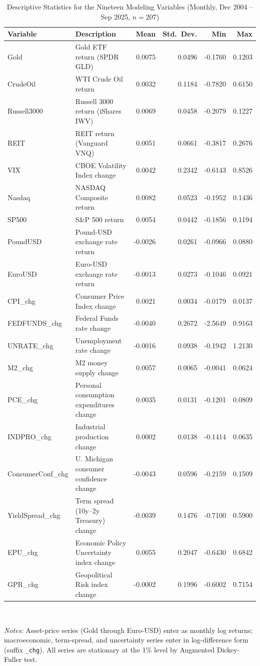 \begin{table}[h!]
\centering
\small
\caption{Descriptive Statistics for the Nineteen Modeling Variables (Monthly, Dec 2004 -- Sep 2025, $n=207$)}
\label{tab:descriptive}
\begin{tabular}{llrrrr}
\toprule
\textbf{Variable} & \textbf{Description} & \textbf{Mean} & \textbf{Std.\ Dev.} & \textbf{Min} & \textbf{Max} \\
\midrule
Gold & Gold ETF return (SPDR GLD) & 0.0075 & 0.0496 & -0.1760 & 0.1203 \\
CrudeOil & WTI Crude Oil return & 0.0032 & 0.1184 & -0.7820 & 0.6150 \\
Russell3000 & Russell 3000 return (iShares IWV) & 0.0069 & 0.0458 & -0.2079 & 0.1227 \\
REIT & REIT return (Vanguard VNQ) & 0.0051 & 0.0661 & -0.3817 & 0.2676 \\
VIX & CBOE Volatility Index change & 0.0042 & 0.2342 & -0.6143 & 0.8526 \\
Nasdaq & NASDAQ Composite return & 0.0082 & 0.0523 & -0.1952 & 0.1436 \\
SP500 & S\&P 500 return & 0.0054 & 0.0442 & -0.1856 & 0.1194 \\
PoundUSD & Pound-USD exchange rate return & -0.0026 & 0.0261 & -0.0966 & 0.0880 \\
EuroUSD & Euro-USD exchange rate return & -0.0013 & 0.0273 & -0.1046 & 0.0921 \\
CPI\_chg & Consumer Price Index change & 0.0021 & 0.0034 & -0.0179 & 0.0137 \\
FEDFUNDS\_chg & Federal Funds rate change & -0.0040 & 0.2672 & -2.5649 & 0.9163 \\
UNRATE\_chg & Unemployment rate change & -0.0016 & 0.0938 & -0.1942 & 1.2130 \\
M2\_chg & M2 money supply change & 0.0057 & 0.0065 & -0.0041 & 0.0624 \\
PCE\_chg & Personal consumption expenditures change & 0.0035 & 0.0131 & -0.1201 & 0.0809 \\
INDPRO\_chg & Industrial production change & 0.0002 & 0.0138 & -0.1414 & 0.0635 \\
ConsumerConf\_chg & U. Michigan consumer confidence change & -0.0043 & 0.0596 & -0.2159 & 0.1509 \\
YieldSpread\_chg & Term spread (10y--2y Treasury) change & -0.0039 & 0.1476 & -0.7100 & 0.5900 \\
EPU\_chg & Economic Policy Uncertainty index change & 0.0055 & 0.2047 & -0.6430 & 0.6842 \\
GPR\_chg & Geopolitical Risk index change & -0.0002 & 0.1996 & -0.6002 & 0.7154 \\
\bottomrule
\end{tabular}
\\[6pt]
\begin{minipage}{0.95\textwidth}
\footnotesize \textit{Notes:} Asset-price series (Gold through Euro-USD) enter as monthly log returns; macroeconomic, term-spread, and uncertainty series enter in log-difference form (suffix \texttt{\_chg}). All series are stationary at the 1\% level by Augmented Dickey-Fuller test.
\end{minipage}
\end{table}